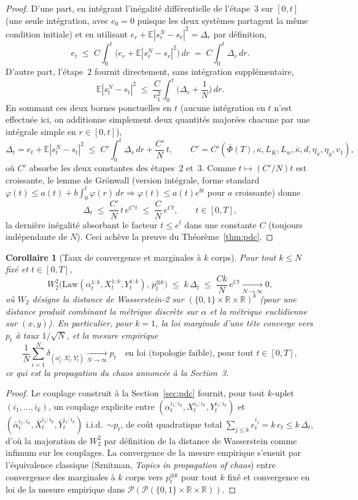 \documentclass[11pt,a4paper]{article}
\newcommand{\E}{\mathbb{E}}
\newcommand{\R}{\mathbb{R}}
\theoremstyle{plain}
\newtheorem{cor}[thm]{Corollaire}
\theoremstyle{definition}
\begin{document}
\begin{proof}
D'une part, en int\'egrant l'in\'egalit\'e diff\'erentielle de l'\'etape~3 sur $[0,t]$ (une seule int\'egration, avec $e_0=0$ puisque les deux syst\`emes partagent la m\^eme condition initiale) et en utilisant $e_r+\E|s_r^N-s_r|^2=\Delta_r$ par d\'efinition,
\[
e_t \;\le\; C\int_0^t\big(e_r+\E|s_r^N-s_r|^2\big)\,dr \;=\; C\int_0^t\Delta_r\,dr.
\]
D'autre part, l'\'etape~2 fournit directement, sans int\'egration suppl\'ementaire,
\[
\E|s_t^N-s_t|^2 \;\le\; \frac{C}{v_1^2}\int_0^t\Big(\Delta_r+\frac1N\Big)\,dr.
\]
En sommant ces deux bornes ponctuelles en $t$ (aucune int\'egration en $t$ n'est effectu\'ee ici, on additionne simplement deux quantit\'es major\'ees chacune par une int\'egrale simple en $r\in[0,t]$),
\[
\Delta_t = e_t+\E|s_t^N-s_t|^2 \;\le\; C'\int_0^t\Delta_r\,dr + \frac{C'}{N}\,t, \qquad C'=C'(\bar\Phi(T),\kappa,L_K,L_w,\bar\kappa,d,\eta_x,\eta_y,v_1),
\]
o\`u $C'$ absorbe les deux constantes des \'etapes~2 et~3. Comme $t\mapsto (C'/N)t$ est croissante, le lemme de Gr\"onwall (version int\'egrale, forme standard $\varphi(t)\le a(t)+b\int_0^t\varphi(r)\,dr \Rightarrow \varphi(t)\le a(t)e^{bt}$ pour $a$ croissante) donne
\[
\Delta_t \;\le\; \frac{C'}{N}\,t\,e^{C't} \;\le\; \frac{C}{N}\,e^{Ct}, \qquad t\in[0,T],
\]
la derni\`ere in\'egalit\'e absorbant le facteur $t\le e^t$ dans une constante $C$ (toujours ind\'ependante de $N$). Ceci ach\`eve la preuve du Th\'eor\`eme~\ref{thm:pdc}.
\end{proof}

\begin{cor}[Taux de convergence et marginales \`a $k$ corps]
Pour tout $k\le N$ fix\'e et $t\in[0,T]$,
\[
W_2^2\Big(\mathrm{Law}(\alpha_t^{1:k},X_t^{1:k},Y_t^{1:k}),\,p_t^{\otimes k}\Big) \;\le\; k\,\Delta_t \;\le\; \frac{Ck}{N}\,e^{Ct} \xrightarrow[N\to\infty]{} 0,
\]
o\`u $W_2$ d\'esigne la distance de Wasserstein-2 sur $(\{0,1\}\times\R\times\R)^k$ (pour une distance produit combinant la m\'etrique discr\`ete sur $\alpha$ et la m\'etrique euclidienne sur $(x,y)$). En particulier, pour $k=1$, la loi marginale d'une t\^ete converge vers $p_t$ \`a taux $1/\sqrt N$, et la mesure empirique
\[
\frac1N\sum_{i=1}^N\delta_{(\alpha_t^i,X_t^i,Y_t^i)} \xrightarrow[N\to\infty]{} p_t \quad\text{en loi (topologie faible), pour tout } t\in[0,T],
\]
ce qui est la propagation du chaos annonc\'ee \`a la Section~3.
\end{cor}
\begin{proof}
Le couplage construit \`a la Section~\ref{sec:pdc} fournit, pour tout $k$-uplet $(i_1,\ldots,i_k)$, un couplage explicite entre $(\alpha^{i_1:i_k}_t,X_t^{i_1:i_k},Y_t^{i_1:i_k})$ et $(\bar\alpha^{i_1:i_k}_t,\bar X_t^{i_1:i_k},\bar Y_t^{i_1:i_k})$ i.i.d.\ $\sim p_t$, de co\^ut quadratique total $\sum_{j\le k}e_t^{i_j}=k\,e_t\le k\,\Delta_t$, d'o\`u la majoration de $W_2^2$ par d\'efinition de la distance de Wasserstein comme infimum sur les couplages. La convergence de la mesure empirique s'ensuit par l'\'equivalence classique (Sznitman, \emph{Topics in propagation of chaos}) entre convergence des marginales \`a $k$ corps vers $p_t^{\otimes k}$ pour tout $k$ fix\'e et convergence en loi de la mesure empirique dans $\mathcal P(\mathcal P(\{0,1\}\times\R\times\R))$.
\end{proof}
\end{document}
